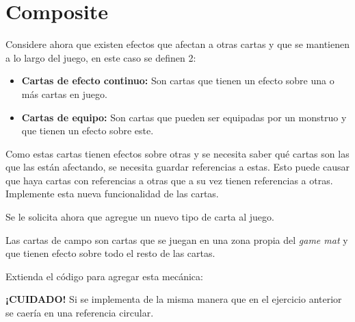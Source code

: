\section{Composite}
  \begin{Exercise}[
      title={Cartas de efecto continuo},
      label={ex:composite-1}, 
      difficulty=2
    ]
    Considere ahora que existen efectos que afectan a otras cartas y que se mantienen a lo
    largo del juego, en este caso se definen 2:
    \begin{itemize}
      \item \textbf{Cartas de efecto continuo:} Son cartas que tienen un efecto sobre una 
        o más cartas en juego.
      \item \textbf{Cartas de equipo:} Son cartas que pueden ser equipadas por un monstruo 
        y que tienen un efecto sobre este.
    \end{itemize}

    Como estas cartas tienen efectos sobre otras y se necesita saber qué cartas son las 
    que las están afectando, se necesita guardar referencias a estas.
    Esto puede causar que haya cartas con referencias a otras que a su vez tienen 
    referencias a otras.
    Implemente esta nueva funcionalidad de las cartas. 
  \end{Exercise}

  \begin{Exercise}[title={Cartas de campo}, label={ex:composite-2}, difficulty=4]
    Se le solicita ahora que agregue un nuevo tipo de carta al juego.

    Las cartas de campo son cartas que se juegan en una zona propia del \textit{game mat}
    y que tienen efecto sobre todo el resto de las cartas.

    Extienda el código para agregar esta mecánica:

    \textbf{¡CUIDADO!} Si se implementa de la misma manera que en el ejercicio anterior se
    caería en una referencia circular.
  \end{Exercise}
%
